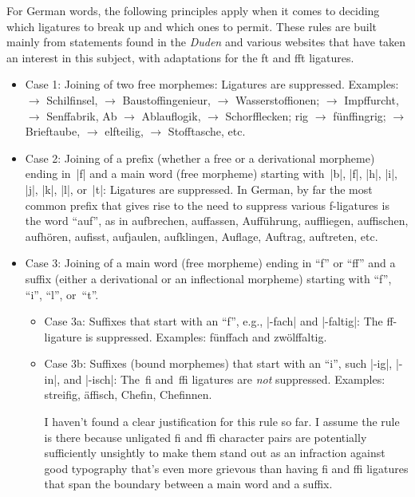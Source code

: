 \documentclass[11pt]{article}
\begin{document}
For German words, the following principles apply when it comes to deciding which ligatures to break up and which ones to permit. These rules are built mainly from statements found in the \emph{Duden} and various websites that have taken an interest in this subject, with adaptations for the ft and fft ligatures.
\begin{itemize}
\item Case 1: Joining of two free morphemes: Ligatures are suppressed. Examples: 
 $\to$ Schilfinsel, 
 $\to$ Baustoffingenieur,
 $\to$ Wasserstoffionen;  $\to$ Impffurcht, 
 $\to$ Senffabrik, 
Ab\- $\to$ Ablauflogik,  
 $\to$ Schorfflecken; 
\-rig $\to$ fünffingrig; 
 $\to$ Brieftaube, 
 $\to$ elfteilig, 
 $\to$ Stofftasche, 
etc.

\item Case 2: Joining of a prefix (whether a free or a derivational morpheme) ending in~|f| and a main word (free morpheme) starting with~|b|, |f|, |h|, |i|, |j|, |k|, |l|, or~|t|: Ligatures are suppressed. In German, by far the most common prefix that gives rise to the need to suppress various f-ligatures is the word \enquote{auf}, as in aufbrechen, auffassen, Aufführung, auffliegen, auffischen, aufhören, aufisst, aufjaulen, aufklingen, Auflage, Auftrag, auftreten, etc.

\item Case 3: Joining of a main word (free morpheme) ending in \enquote{f} or \enquote{ff} and a suffix (either a derivational or an inflectional morpheme) starting with \enquote{f}, \enquote{i}, \enquote{l}, or~\enquote{t}.

\begin{itemize}
\item Case 3a: Suffixes that start with an \enquote{f}, e.g., |-fach| and |-faltig|: The ff-ligature is suppressed. Examples: fünffach and zwölffaltig. 

\item Case 3b: Suffixes (bound morphemes) that start with an \enquote{i}, such |-ig|, |-in|, and |-isch|: The~fi and~ffi ligatures are \emph{not} suppressed. Examples: streifig, äffisch, Chefin, Chefinnen.

I haven't found a clear justification for this rule so far. I assume the rule is there because unligated f\breaklig i and ff\breaklig i character pairs are potentially sufficiently unsightly to make them stand out as an infraction against good typography that's even more grievous than having fi and ffi ligatures that span the boundary between a main word and a suffix.



\end{itemize}
\end{itemize}
\end{document}

